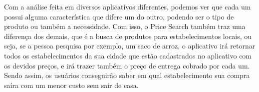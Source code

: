 Com a análise feita em diversos aplicativos diferentes, podemos ver que cada um possui alguma característica que difere um do outro, podendo ser o tipo de produto ou também a necessidade. Com isso, o Price Search também traz uma diferença dos demais, que é a busca de produtos para estabelecimentos locais, ou seja, se a pessoa pesquisa por exemplo, um saco de arroz, o aplicativo irá retornar todos os estabelecimentos da sua cidade que estão cadastrados no aplicativo com os devidos preços, e irá trazer também o preço de entrega cobrado por cada um. Sendo assim, os usuários conseguirão saber em qual estabelecimento sua compra saíra com um menor custo sem sair de casa.